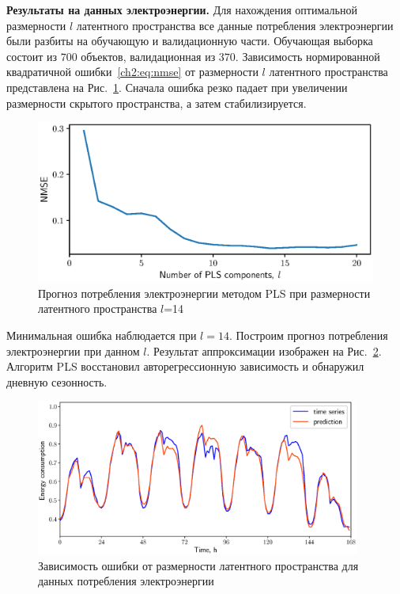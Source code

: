 \textbf{Результаты на данных электроэнергии.}
Для нахождения оптимальной размерности $l$ латентного пространства все данные потребления электроэнергии были разбиты на обучающую и валидационную части. 
Обучающая выборка состоит из $700$ объектов, валидационная из $370$. Зависимость нормированной квадратичной ошибки~\eqref{ch2:eq:nmse} от размерности $l$ латентного пространства представлена на Рис.~\ref{ch2:fig:energy_n_comp}. 
Сначала ошибка резко падает при увеличении размерности скрытого пространства, а затем стабилизируется.

\begin{figure}[ht]
	\centering
	\includegraphics[width=0.75\linewidth]{figs/ch2/energy_n_comp}
	\caption{Прогноз потребления электроэнергии методом PLS при размерности латентного пространства $l$=14}
	\label{ch2:fig:energy_n_comp}
\end{figure}

Минимальная ошибка наблюдается при $l=14$. 
Построим прогноз потребления электроэнергии при данном $l$. 
Результат аппроксимации изображен на Рис.~\ref{ch2:fig:energy_prediction}. Алгоритм PLS восстановил авторегрессионную зависимость и обнаружил дневную сезонность.

\begin{figure}[ht]
	\centering
	\includegraphics[width=0.95\textwidth]{figs/ch2/energy_prediction}
	\caption{Зависимость ошибки от размерности латентного пространства для данных потребления электроэнергии}
	\label{ch2:fig:energy_prediction}
\end{figure}

